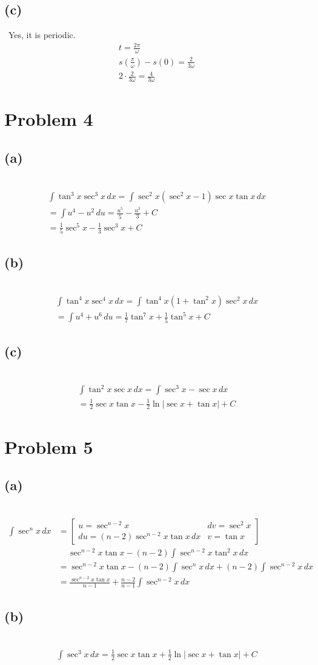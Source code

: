 \documentclass[12pt]{article}
\newcommand{\problem}[1]{\section{Problem #1}}
\newcommand{\subproblem}[1]{\subsection{(#1)} \,}
\begin{document}
\subproblem{c}
Yes, it is periodic.
\begin{gather*}
    t= \frac{2\pi}{\omega } \\
    s(\frac{\pi}{\omega}) - s(0)= \frac{2}{3\omega}\\
    2\cdot \frac{2}{3\omega} = \boxed{\frac{4}{3\omega}}
\end{gather*}

\problem{4}

\subproblem{a}
\begin{gather*}
    \int \tan^3 x \sec^3 x \, dx = \int \sec^2x(\sec^2x -1) \sec x \tan x \, dx\\
    =\int u^4-u^2\, du = \frac{u^5}{5} -\frac{u^3}{3}+C\\
    =\boxed{\frac{1}{5} \sec^5 x-\frac{1}{3}\sec^3 x+C}
\end{gather*}

\subproblem{b}
\begin{gather*}
    \int \tan^4 x \sec^4x \, dx = \int \tan^4x(1+\tan^2x) \sec^2 x\, dx\\
    =\int u^4+u^6\,  du = \boxed{\frac{1}{7}\tan^7x+\frac{1}{5}\tan^5x+C}
\end{gather*}

\subproblem{c}
\begin{gather*}
    \int \tan^2 x\sec x\, dx = \int \sec^3 x-\sec x \, dx\\
    =\boxed{ \frac{1}{2}\sec x\tan x -\frac{1}{2}\ln |\sec x + \tan x |+C}
\end{gather*}

\problem{5}

\subproblem{a}
\begin{align*}
    \int \sec^nx\, dx &= \begin{bmatrix}
        u=\sec^{n-2}x & dv=\sec^2 x\\
        du=(n-2)\sec^{n-2} x \tan x \, dx & v = \tan x 
    \end{bmatrix}\\
    & \,\,\,\,\,\,\,\sec^{n-2}x\tan x - (n-2)\int \sec^{n-2}x\tan^2 x\, dx\\
    &=  \sec^{n-2}x\tan x - (n-2)\int \sec^{n}x\, dx +(n-2)\int \sec^{n-2}x\, dx\\
    &= \boxed{\frac{\sec^{n-2}x\tan x}{n-1} +\frac{n-2}{n-1}\int \sec^{n-2}x\, dx}
\end{align*}

\subproblem{b}
\begin{gather*}
    \int \sec^3 x \, dx = \boxed{\frac{1}{2}\sec x \tan x + \frac{1}{2} \ln |\sec x +\tan x |+C}
\end{gather*}
\end{document}

